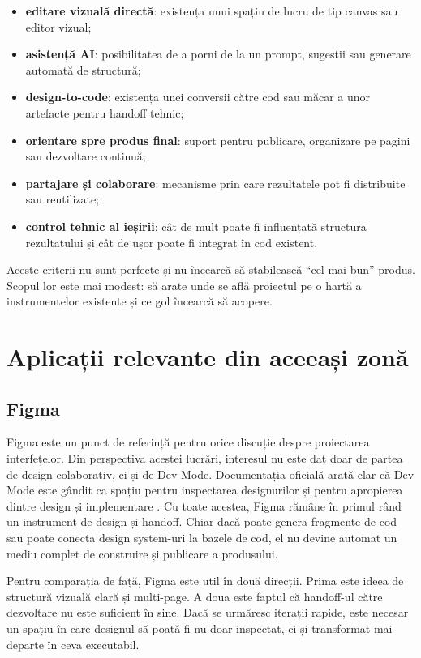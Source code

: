 \begin{itemize}[leftmargin=1.5cm]
  \item \textbf{editare vizuală directă}: existența unui spațiu de lucru de tip canvas sau editor vizual;
  \item \textbf{asistență AI}: posibilitatea de a porni de la un prompt, sugestii sau generare automată de structură;
  \item \textbf{design-to-code}: existența unei conversii către cod sau măcar a unor artefacte pentru handoff tehnic;
  \item \textbf{orientare spre produs final}: suport pentru publicare, organizare pe pagini sau dezvoltare continuă;
  \item \textbf{partajare și colaborare}: mecanisme prin care rezultatele pot fi distribuite sau reutilizate;
  \item \textbf{control tehnic al ieșirii}: cât de mult poate fi influențată structura rezultatului și cât de ușor poate fi integrat în cod existent.
\end{itemize}

Aceste criterii nu sunt perfecte și nu încearcă să stabilească ``cel mai bun'' produs. Scopul lor este mai modest: să arate unde se află proiectul pe o hartă a instrumentelor existente și ce gol încearcă să acopere.

\section{Aplicații relevante din aceeași zonă}

\subsection{Figma}

Figma este un punct de referință pentru orice discuție despre proiectarea interfețelor. Din perspectiva acestei lucrări, interesul nu este dat doar de partea de design colaborativ, ci și de Dev Mode. Documentația oficială arată clar că Dev Mode este gândit ca spațiu pentru inspectarea designurilor și pentru apropierea dintre design și implementare \cite{figmaDevMode2026}. Cu toate acestea, Figma rămâne în primul rând un instrument de design și handoff. Chiar dacă poate genera fragmente de cod sau poate conecta design system-uri la bazele de cod, el nu devine automat un mediu complet de construire și publicare a produsului.

Pentru comparația de față, Figma este util în două direcții. Prima este ideea de structură vizuală clară și multi-page. A doua este faptul că handoff-ul către dezvoltare nu este suficient în sine. Dacă se urmăresc iterații rapide, este necesar un spațiu în care designul să poată fi nu doar inspectat, ci și transformat mai departe în ceva executabil.

